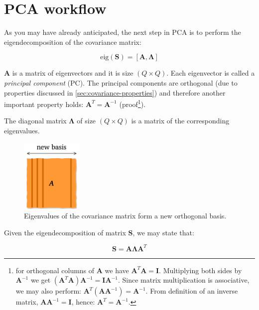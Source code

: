 \documentclass[10pt,twocolumn]{article}
\begin{document}

\section{PCA workflow}

As you may have already anticipated, the next step in PCA is to perform the eigendecomposition of the covariance matrix:

\begin{equation} \label{eq:eig-dec}
\text{eig}(\bm{S}) = [\bm{A}, \bm{\Lambda}]
\end{equation}



$\bm{A}$ is a matrix of eigenvectors and it is size $(Q \times Q)$. Each eigenvector is called a \textit{principal component} (PC). The principal components are orthogonal (due to properties discussed in \ref{sec:covariance-properties}) and therefore another important property holds: $\bm{A}^T = \bm{A}^{-1}$ (proof\footnote{for orthogonal columns of $\bm{A}$ we have $\bm{A}^T \bm{A} = \bm{I}$. Multiplying both sides by $\bm{A}^{-1}$ we get $(\bm{A}^T \bm{A}) \bm{A}^{-1}= \bm{I}\bm{A}^{-1}$. Since matrix multiplication is associative, we may also perform: $\bm{A}^T (\bm{A} \bm{A}^{-1}) = \bm{A}^{-1}$. From definition of an inverse matrix,  $\bm{A} \bm{A}^{-1} = \bm{I}$, hence: $\bm{A}^T = \bm{A}^{-1}$.}).

The diagonal matrix $\bm{\Lambda}$ of size $(Q \times Q)$ is a matrix of the corresponding eigenvalues.

\begin{figure}[H]
\centering\includegraphics[width=3cm]{new-basis.png}
\caption{Eigenvalues of the covariance matrix form a new orthogonal basis.}
\label{fig:new-basis}
\end{figure}

Given the eigendecomposition of matrix $\bm{S}$, we may state that: 

\begin{equation} \label{eq:eig-dec-cov-matrix}
\bm{S} = \bm{A} \bm{\Lambda} \bm{A}^T
\end{equation}
\end{document}
